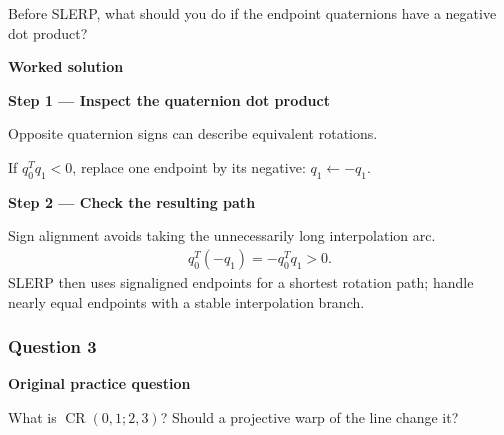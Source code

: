 \documentclass[letterpaper,11pt,english,openany,oneside]{jupyterBook}
\begin{document}
\sphinxAtStartPar
Before SLERP, what should you do if the endpoint quaternions have a negative dot product?

\par\medskip

\par\medskip
\textbf{Worked solution}\par\smallskip

\par\medskip{}
{\color{QuizStepRed}\bfseries Step 1 — Inspect the quaternion dot product}\par\smallskip

\sphinxAtStartPar
{} Opposite quaternion signs can describe equivalent rotations.

\sphinxAtStartPar
If {\color{QuizMathBlue} \(q_0^Tq_1<0\)}, replace one endpoint by its negative: {\color{QuizMathBlue} \(q_1\leftarrow-q_1\)}.

\par

\par\medskip{}
{\color{QuizStepRed}\bfseries Step 2 — Check the resulting path}\par\smallskip

\sphinxAtStartPar
{} Sign alignment avoids taking the unnecessarily long interpolation arc.
{\color{QuizMathBlue} \begin{equation*}
\begin{split}
q_0^T(-q_1)=-q_0^Tq_1>0.
\end{split}
\end{equation*}}
\sphinxAtStartPar
SLERP then uses sign\sphinxhyphen{}aligned endpoints for a shortest rotation path; handle nearly equal endpoints with a stable interpolation branch.

\par

\par\medskip


\subsubsection{Question 3}
\label{\detokenize{lectures/lecture02/tldr:question-3}}\label{\detokenize{lectures/lecture02/tldr:lec02-tldr-q3}}
\par\medskip\textbf{Original practice question}\par\smallskip

\sphinxAtStartPar
What is \(\operatorname{CR}(0,1;2,3)\)? Should a projective warp of the line change it?
\end{document}
